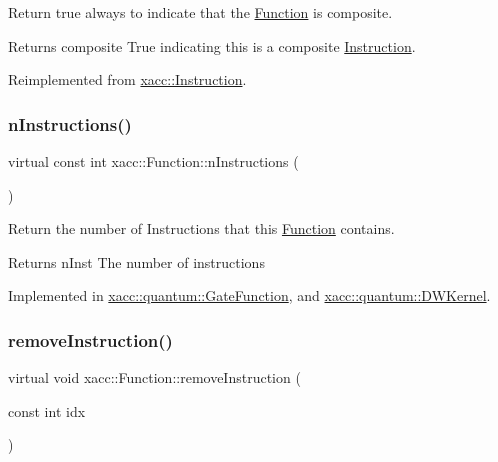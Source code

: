 Return true always to indicate that the \hyperlink{a01151}{Function} is composite.

\begin{DoxyReturn}{Returns}
composite True indicating this is a composite \hyperlink{a01155}{Instruction}. 
\end{DoxyReturn}


Reimplemented from \hyperlink{a01155_a4383f1036d0fcfe890ab9c613dbd5f38}{xacc\+::\+Instruction}.

\mbox{\label{a01151_a8901985525f59713e14c61713e07c086}} 
\subsubsection{\texorpdfstring{n\+Instructions()}{nInstructions()}}
{\footnotesize\ttfamily virtual const int xacc\+::\+Function\+::n\+Instructions (\begin{DoxyParamCaption}{ }\end{DoxyParamCaption})\hspace{0.3cm}{\ttfamily [pure virtual]}}

Return the number of Instructions that this \hyperlink{a01151}{Function} contains.

\begin{DoxyReturn}{Returns}
n\+Inst The number of instructions 
\end{DoxyReturn}


Implemented in \hyperlink{a01011_aa70b26156c060fec71316fe5e98bb102}{xacc\+::quantum\+::\+Gate\+Function}, and \hyperlink{a00983_a79aecc7419a20b8779372ef36fc24806}{xacc\+::quantum\+::\+D\+W\+Kernel}.

\mbox{\label{a01151_ab6478b09bb28e194bb555b3180737733}} 
\subsubsection{\texorpdfstring{remove\+Instruction()}{removeInstruction()}}
{\footnotesize\ttfamily virtual void xacc\+::\+Function\+::remove\+Instruction (\begin{DoxyParamCaption}\item[{const int}]{idx }\end{DoxyParamCaption})\hspace{0.3cm}{\ttfamily [pure virtual]}}

